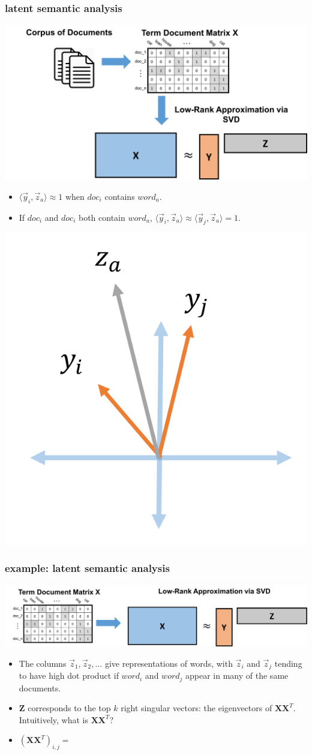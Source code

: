\documentclass[handout,compress]{beamer}
\newcommand{\bv}[1]{\mathbf{#1}}
\begin{document}
\begin{frame}
	\frametitle{latent semantic analysis}
	\begin{center}
		\includegraphics[width=.8\textwidth]{lsa.png}
	\end{center}
	\begin{itemize}
		\item $\langle \vec y_i, \vec z_a \rangle \approx 1$ when $doc_i$ contains $word_a$. 
		\item If $doc_i$ and $doc_i$ both contain $word_a$, $\langle \vec y_i, \vec z_a \rangle \approx \langle \vec y_j, \vec z_a \rangle = 1$.
	\end{itemize}
	\vspace{-2em}
	\begin{center}
		\includegraphics[width=.25\textwidth]{lsa2.png}
	\end{center}
\end{frame}

\begin{frame}
	\frametitle{example: latent semantic analysis}
	\begin{center}
		\includegraphics[width=.9\textwidth]{lsa3.png}
	\end{center}
	\vspace{-1em}
	\begin{itemize}
		\item The columns $\vec z_1, \vec z_2,\ldots $ give representations of words, with $\vec z_i$ and $\vec z_j$ tending to have high dot product if $word_i$ and $word_j$ appear in many of the same documents.
		\item  $\bv{Z}$ corresponds to the top $k$ right singular vectors: the eigenvectors of $\bv{X} \bv{X}^T$. \alert{Intuitively, what is $\bv{X} \bv{X}^T$?}
		\item $(\bv{X} \bv{X}^T)_{i,j} = $ 
	\end{itemize}
\end{frame}
\end{document}
